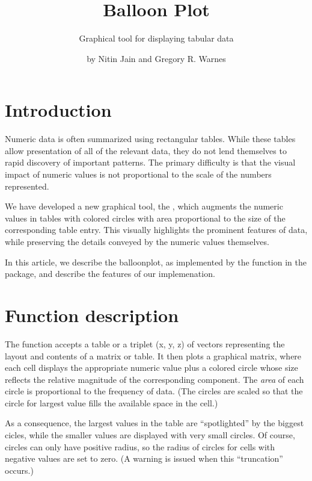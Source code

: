 \documentclass[a4paper]{report}
\begin{document}
\begin{article}
\author{by Nitin Jain and Gregory R. Warnes}
\title{Balloon Plot}
\subtitle{Graphical tool for displaying tabular data}

\maketitle

\section*{Introduction}

Numeric data is often summarized using rectangular tables. While
these tables allow presentation of all of the relevant data, they do
not lend themselves to rapid discovery of important patterns. The
primary difficulty is that the visual impact of numeric values is
not proportional to the scale of the numbers represented.

We have developed a new graphical tool, the ,
which augments the numeric values in tables with colored circles
with area proportional to the size of the corresponding table
entry. This visually highlights the prominent features of
data, while preserving the details conveyed by the numeric values
themselves.

In this article, we describe the balloonplot, as
implemented by the  function in the
 package, and describe the features of our
implemenation.


\section*{Function description}

The function  accepts a table or a triplet (x,
y, z) of vectors representing the layout and contents of a matrix or
table.  It then plots a graphical matrix, where each cell displays
the appropriate numeric value plus a colored circle whose size
reflects the relative magnitude of the corresponding component. The
\emph{area} of each circle is proportional to the frequency of
data. (The circles are scaled so that the circle for largest value
fills the available space in the cell.)

As a consequence, the largest values in the table are ``spotlighted''
by the biggest cicles, while the smaller values are displayed
with very small circles.  Of course, circles can only have positive
radius, so the radius of circles for cells with negative values are
set to zero.  (A warning is issued when this ``truncation'' occurs.)


\end{article}
\end{document}
